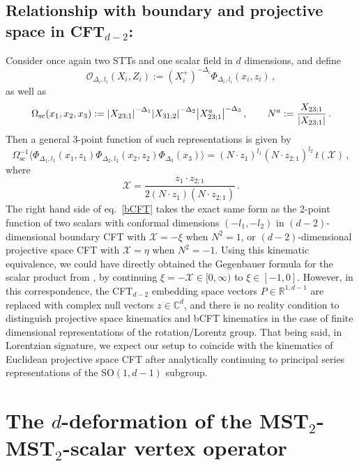 \documentclass{article}
\def \Dg {\Delta}
\def \Rs {\mathbb{R}}
\def \Cs {\mathbb{C}}
\def \oo {\mathcal{O}}
\begin{document}
\subsection{Relationship with boundary and projective space in \texorpdfstring{CFT$_{d-2}$}{CFT in (d-2)}:}
\label{ssec:bCFT}
Consider once again two STTs and one scalar field in $d$ dimensions, and define
\begin{equation}
    \oo_{\Dg_i,l_i}(X_i,Z_i) := (X_i^+)^{-\Dg_i} \Phi_{\Dg_i,l_i}(x_i,z_i)\,,
\end{equation}
as well as 
\begin{equation}
    \Omega_{\mathrm{sc}}(x_1,x_2,x_3) := \abs{X_{23;1}}^{-\Dg_1} \abs{X_{31;2}}^{-\Dg_2} \abs{X^a_{23;1}}^{-\Dg_3}\,, \qquad N^a := \frac{X_{23;1}}{\abs{X_{23;1}}}\,. 
\end{equation}
Then a general 3-point function of such representations is given by
\begin{equation}
\Omega_{\mathrm{sc}}^{-1} \langle \Phi_{\Dg_1,l_1}(x_1,z_1) \Phi_{\Dg_2,l_2}(x_2,z_2) \Phi_{\Dg_3}(x_3) \rangle = (N\cdot z_1)^{l_1} (N\cdot z_{2;1})^{l_2}\, t (\mathcal{X})\,,
\label{bCFT}
\end{equation}
where
\begin{equation}
    \mathcal{X} = \frac{z_1 \cdot z_{2;1}}{2 (N\cdot z_1) (N\cdot z_{2;1})}\,.
\end{equation}
The right hand side of eq.\ \eqref{bCFT} takes the exact same form as the 2-point function of two scalars with conformal dimensions $(-l_1,-l_2)$ in $(d-2)$-dimensional boundary CFT with $\mathcal{X}= -\xi$ when $N^2 = 1$, or $(d-2)$-dimensional projective space CFT with $\mathcal{X}=\eta$ when $N^2 = -1$. Using this kinematic equivalence, we could have directly obtained the Gegenbauer formula for the scalar product from \cite[Eq.~4.10]{mazavc2019analytic}, by continuing $\xi=-\mathcal{X} \in [0,\infty)$ to $\xi \in [-1,0]$. However, in this correspondence, the CFT$_{d-2}$ embedding space vectors $P \in \Rs^{1,d-1}$ are replaced with complex null vectors $z \in \Cs^d$, and there is no reality condition to distinguish projective space kinematics and bCFT kinematics in the case of finite dimensional representations of the rotation/Lorentz group. That being said, in Lorentzian signature, we expect our setup to coincide with the kinematics of Euclidean projective space CFT after analytically continuing to principal series representations of the $\mathrm{SO}(1,d-1)$ subgroup.

\section{The \texorpdfstring{$d$}{d}-deformation of the \texorpdfstring{MST$_2$-MST$_2$}{MST2-MST2}-scalar vertex operator}
\label{app:d_def}
\end{document}

